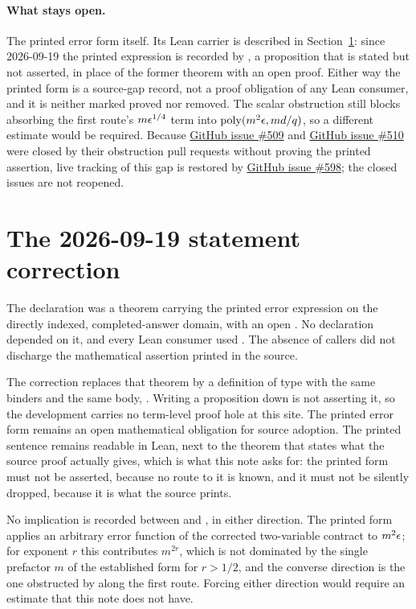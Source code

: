 \documentclass[11pt]{article}
\DeclareMathOperator{\poly}{poly}
\renewcommand{\ghissue}[1]{%
  \href{https://github.com/Dengnifer/MIPStarRE-QPBT/issues/#1}{GitHub issue \##1}}
\begin{document}
\paragraph{What stays open.}
The printed error form itself.  Its Lean carrier is described in
Section~\ref{sec:printed-claim-correction}: since 2026-09-19 the printed
expression is recorded by , a
proposition that is stated but not asserted, in place of the former theorem
 with an open proof.  Either way the printed
form is a source-gap record, not a proof obligation of any Lean consumer, and it
is neither marked proved nor removed.
The scalar obstruction 
still blocks absorbing the first route's $m\epsilon^{1/4}$ term into
$\poly(m^2\eps,md/q)$, so a different estimate would be required. Because
\ghissue{509} and \ghissue{510} were closed by their obstruction pull requests
without proving the printed assertion, live tracking of this gap is restored by
\ghissue{598}; the closed issues are not reopened.

\section{The 2026-09-19 statement correction}
\label{sec:printed-claim-correction}

The declaration  was a theorem carrying
the printed error expression on the directly indexed, completed-answer domain,
with an open . No declaration depended on it, and every Lean
consumer used . The absence of
callers did not discharge the mathematical assertion printed in the source.

The correction replaces that theorem by a definition of type  with
the same binders and the same body,
.  Writing a proposition down is not
asserting it, so the development carries no term-level proof hole at this site.
The printed error form remains an open mathematical obligation for source
adoption. The printed sentence remains
readable in Lean, next to the theorem that states what the source proof
actually gives, which is what this note asks for: the printed form must not be
asserted, because no route to it is known, and it must not be silently dropped,
because it is what the source prints.

No implication is recorded between  and
, in either direction.  The
printed form applies an arbitrary error function of the corrected two-variable
contract to $m^2\epsilon$; for exponent $r$ this contributes $m^{2r}$, which is not
dominated by the single prefactor $m$ of the established form for $r > 1/2$,
and the converse direction is the one obstructed by
 along the first route.  Forcing
either direction would require an estimate that this note does not have.
\end{document}
